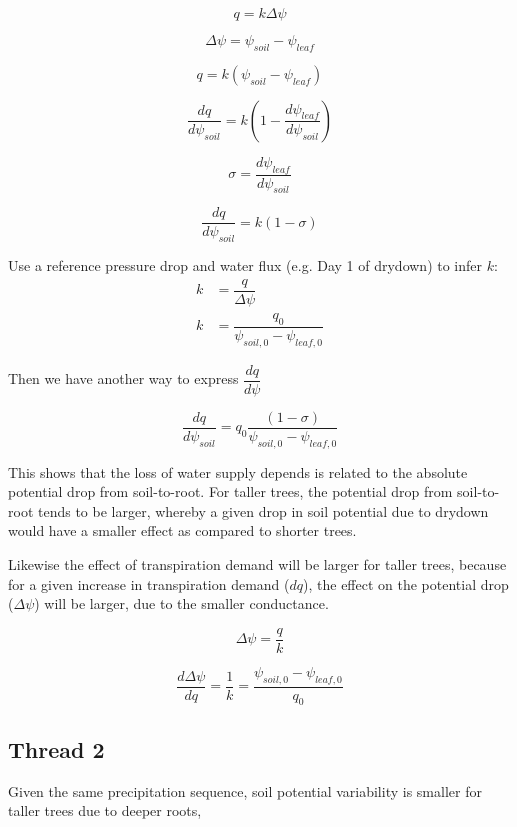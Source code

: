 \documentclass[11pt]{article}
\begin{document}
\begin{equation}
q = k\Delta{\psi}
\end{equation}

\begin{equation}
\Delta{\psi} = \psi_{soil}-\psi_{leaf}
\end{equation}

\begin{equation}
q = k\left(\psi_{soil}-\psi_{leaf}\right)
\end{equation}

\begin{equation}
\dfrac{dq}{d\psi_{soil}} = k\left(1-\dfrac{d\psi_{leaf}}{d\psi_{soil}} \right)
\end{equation}

\begin{equation}
\sigma = \dfrac{d\psi_{leaf}}{d\psi_{soil}}
\end{equation}

\begin{equation}
\dfrac{dq}{d\psi_{soil}} = k\left(1-\sigma \right)
\end{equation}

Use a reference pressure drop and water flux (e.g. Day 1 of drydown) to infer $k$:
\begin{equation}
\begin{aligned}
k&=\dfrac{q}{\Delta{\psi}} \\
k&=\dfrac{q_0}{\psi_{soil,0}-\psi_{leaf,0}}
\end{aligned}
\end{equation}

Then we have another way to express $\dfrac{dq}{d\psi}$

\begin{equation}
\dfrac{dq}{d\psi_{soil}} = q_0\dfrac{\left(1-\sigma \right)}{\psi_{soil,0}-\psi_{leaf,0}}
\end{equation}

This shows that the loss of water supply depends is related to the absolute potential drop from soil-to-root.
For taller trees, the potential drop from soil-to-root tends to be larger, whereby a given drop in soil potential due to drydown would have a smaller effect as compared to shorter trees.

Likewise the effect of transpiration demand will be larger for taller trees, because for a given increase in transpiration demand ($dq$),
the effect on the potential drop ($\Delta\psi$) will be larger, due to the smaller conductance.

\begin{equation}
\Delta\psi = \dfrac{q}{k}
\end{equation}

\begin{equation}
\dfrac{d\Delta\psi}{dq} = \dfrac{1}{k} = \dfrac{\psi_{soil,0}-\psi_{leaf,0}}{q_0}
\end{equation}



\subsection{Thread 2}
Given the same precipitation sequence, soil potential variability is smaller for taller trees due to deeper roots, 
\end{document}
